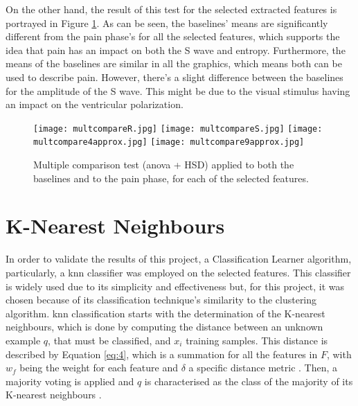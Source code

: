 \pagebreak

On the other hand, the result of this test for the selected extracted features is portrayed in Figure \ref{fig:five_images}. As can be seen, the baselines' means are significantly different from the pain phase's for all the selected features, which supports the idea that pain has an impact on both the S wave and entropy. 
Furthermore, the means of the baselines are similar in all the graphics, which means both can be used to describe pain. However, there’s a slight difference between the baselines for the amplitude of the S wave. This might be due to the visual stimulus having an impact on the ventricular polarization.




\begin{figure}[htbp]
    \centering
    \texttt{[image: multcompareR.jpg]}
    \hfill
    \texttt{[image: multcompareS.jpg]}
    \vspace{0.5em}  %
    \texttt{[image: multcompare4approx.jpg]}
    \hfill
    \texttt{[image: multcompare9approx.jpg]}
    \vspace{0.5em}  %
    \caption{Multiple comparison test (\ac{anova} + HSD) applied to both the baselines and to the pain phase, for each of the selected features.}
    \label{fig:five_images}
\end{figure}

\pagebreak 
\section{K-Nearest Neighbours}

In order to validate the results of this project, a Classification Learner algorithm, particularly, a \ac{knn} classifier was employed on the selected features. This classifier is widely used due to its simplicity and effectiveness but, for this project, it was chosen because of its classification technique's similarity to the clustering algorithm. \ac{knn} classification starts with the determination of the K-nearest neighbours, which is done by computing the distance between an unknown example $q$, that must be classified, and $x_i$ training samples. This distance is described by Equation \ref{eq:4}, which is a summation for all the features in $F$, with $w_f$ being the weight for each feature and $\delta$ a specific distance metric \cite{Cunningham2022}. Then, a majority voting is applied and $q$ is characterised as the class of the majority of its K-nearest neighbours \cite{Papanikolaou2021}.

